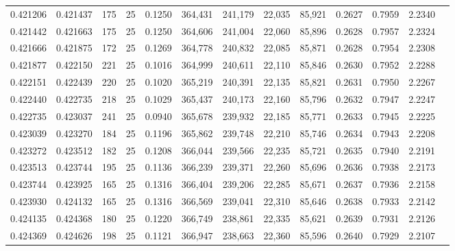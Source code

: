 \begin{tabular}{rrrrrrrrrrrrr}
0.421206 & 0.421437 &   175 &  25 &                                     0.1250 & 364,431 & 241,179 &  22,035 &  85,921 & 0.2627 & 0.7959 & 2.2340 \\
0.421442 & 0.421663 &   175 &  25 &                                     0.1250 & 364,606 & 241,004 &  22,060 &  85,896 & 0.2628 & 0.7957 & 2.2324 \\
0.421666 & 0.421875 &   172 &  25 &                                     0.1269 & 364,778 & 240,832 &  22,085 &  85,871 & 0.2628 & 0.7954 & 2.2308 \\
0.421877 & 0.422150 &   221 &  25 &                                     0.1016 & 364,999 & 240,611 &  22,110 &  85,846 & 0.2630 & 0.7952 & 2.2288 \\
0.422151 & 0.422439 &   220 &  25 &                                     0.1020 & 365,219 & 240,391 &  22,135 &  85,821 & 0.2631 & 0.7950 & 2.2267 \\
0.422440 & 0.422735 &   218 &  25 &                                     0.1029 & 365,437 & 240,173 &  22,160 &  85,796 & 0.2632 & 0.7947 & 2.2247 \\
0.422735 & 0.423037 &   241 &  25 &                                     0.0940 & 365,678 & 239,932 &  22,185 &  85,771 & 0.2633 & 0.7945 & 2.2225 \\
0.423039 & 0.423270 &   184 &  25 &                                     0.1196 & 365,862 & 239,748 &  22,210 &  85,746 & 0.2634 & 0.7943 & 2.2208 \\
0.423272 & 0.423512 &   182 &  25 &                                     0.1208 & 366,044 & 239,566 &  22,235 &  85,721 & 0.2635 & 0.7940 & 2.2191 \\
0.423513 & 0.423744 &   195 &  25 &                                     0.1136 & 366,239 & 239,371 &  22,260 &  85,696 & 0.2636 & 0.7938 & 2.2173 \\
0.423744 & 0.423925 &   165 &  25 &                                     0.1316 & 366,404 & 239,206 &  22,285 &  85,671 & 0.2637 & 0.7936 & 2.2158 \\
0.423930 & 0.424132 &   165 &  25 &                                     0.1316 & 366,569 & 239,041 &  22,310 &  85,646 & 0.2638 & 0.7933 & 2.2142 \\
0.424135 & 0.424368 &   180 &  25 &                                     0.1220 & 366,749 & 238,861 &  22,335 &  85,621 & 0.2639 & 0.7931 & 2.2126 \\
0.424369 & 0.424626 &   198 &  25 &                                     0.1121 & 366,947 & 238,663 &  22,360 &  85,596 & 0.2640 & 0.7929 & 2.2107 \\

\end{tabular}
